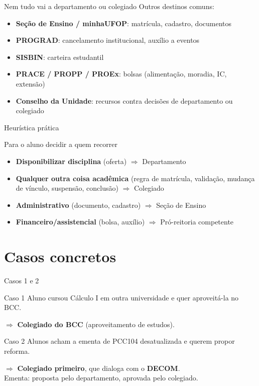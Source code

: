 \documentclass[aspectratio=169]{beamer}
\newcommand{\impt}[1]{\textcolor{maccent}{\textbf{#1}}}
\newcommand{\ntc}[1]{\textcolor{mprimary}{#1}}
\begin{document}
\begin{frame}{Nem tudo vai a departamento ou colegiado}
  Outros destinos comuns:
  \begin{itemize}
    \item \impt{Seção de Ensino / minhaUFOP}: matrícula, cadastro, documentos
    \item \impt{PROGRAD}: cancelamento institucional, auxílio a eventos
    \item \impt{SISBIN}: carteira estudantil
    \item \impt{PRACE / PROPP / PROEx}: bolsas (alimentação, moradia, IC, extensão)
    \item \impt{Conselho da Unidade}: recursos contra decisões de departamento ou colegiado
  \end{itemize}
\end{frame}

\begin{frame}{Heurística prática}
  \begin{block}{Para o aluno decidir a quem recorrer}
    \begin{itemize}
      \item \impt{Disponibilizar disciplina} (oferta) $\Rightarrow$ Departamento
      \item \impt{Qualquer outra coisa acadêmica} (regra de matrícula, validação, mudança de vínculo, suspensão, conclusão) $\Rightarrow$ Colegiado
      \item \impt{Administrativo} (documento, cadastro) $\Rightarrow$ Seção de Ensino
      \item \impt{Financeiro/assistencial} (bolsa, auxílio) $\Rightarrow$ Pró-reitoria competente
    \end{itemize}
  \end{block}
\end{frame}

\section{Casos concretos}

\begin{frame}{Casos 1 e 2}
  \begin{alertblock}{Caso 1}
    Aluno cursou Cálculo I em outra universidade e quer aproveitá-la no BCC.
  \end{alertblock}
   
  $\Rightarrow$ \impt{Colegiado do BCC} (aproveitamento de estudos).

  \vspace{0.5cm}
   
  \begin{alertblock}{Caso 2}
    Alunos acham a ementa de PCC104 desatualizada e querem propor reforma.
  \end{alertblock}
   
  $\Rightarrow$ \impt{Colegiado primeiro}, que dialoga com o \impt{DECOM}.\\
  \ntc{Ementa: proposta pelo departamento, aprovada pelo colegiado.}
\end{frame}
\end{document}
